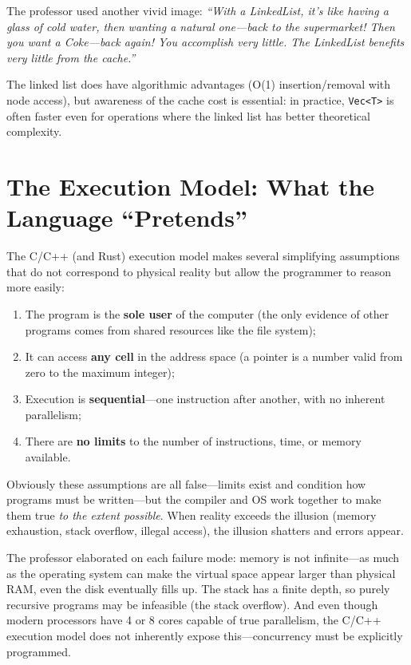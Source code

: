 The professor used another vivid image: \emph{``With a LinkedList, it's like having a glass of cold water, then wanting a natural one---back to the supermarket! Then you want a Coke---back again! You accomplish very little. The LinkedList benefits very little from the cache.''}

The linked list does have algorithmic advantages (O(1) insertion/removal with node access), but awareness of the cache cost is essential: in practice, \texttt{Vec<T>} is often faster even for operations where the linked list has better theoretical complexity.

\section{The Execution Model: What the Language ``Pretends''}

The C/C++ (and Rust) execution model makes several simplifying assumptions that do not correspond to physical reality but allow the programmer to reason more easily:

\begin{enumerate}
    \item The program is the \textbf{sole user} of the computer (the only evidence of other programs comes from shared resources like the file system);
    \item It can access \textbf{any cell} in the address space (a pointer is a number valid from zero to the maximum integer);
    \item Execution is \textbf{sequential}---one instruction after another, with no inherent parallelism;
    \item There are \textbf{no limits} to the number of instructions, time, or memory available.
\end{enumerate}

Obviously these assumptions are all false---limits exist and condition how programs must be written---but the compiler and OS work together to make them true \emph{to the extent possible}. When reality exceeds the illusion (memory exhaustion, stack overflow, illegal access), the illusion shatters and errors appear.

The professor elaborated on each failure mode: memory is not infinite---as much as the operating system can make the virtual space appear larger than physical RAM, even the disk eventually fills up. The stack has a finite depth, so purely recursive programs may be infeasible (the stack overflow). And even though modern processors have 4 or 8 cores capable of true parallelism, the C/C++ execution model does not inherently expose this---concurrency must be explicitly programmed.

